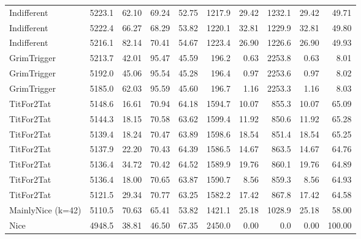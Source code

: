 \documentclass[journal,a4paper,10pt,twoside]{IEEEtran} %
\begin{document}
\begin{table}[ht]
\begin{tabular}{l|rrrr|rrrrr}
		Indifferent       & 5223.1 & 62.10 &     69.24 &    52.75 & 1217.9 &                  29.42 & 1232.1 &                   29.42 &  49.71 \\
		Indifferent       & 5222.4 & 66.27 &     68.29 &    53.82 & 1220.1 &                  32.81 & 1229.9 &                   32.81 &  49.80 \\
		Indifferent       & 5216.1 & 82.14 &     70.41 &    54.67 & 1223.4 &                  26.90 & 1226.6 &                   26.90 &  49.93 \\
		GrimTrigger       & 5213.7 & 42.01 &     95.47 &    45.59 &  196.2 &                   0.63 & 2253.8 &                    0.63 &   8.01 \\
		GrimTrigger       & 5192.0 & 45.06 &     95.54 &    45.28 &  196.4 &                   0.97 & 2253.6 &                    0.97 &   8.02 \\
		GrimTrigger       & 5185.0 & 62.03 &     95.59 &    45.60 &  196.7 &                   1.16 & 2253.3 &                    1.16 &   8.03 \\
		TitFor2Tat        & 5148.6 & 16.61 &     70.94 &    64.18 & 1594.7 &                  10.07 &  855.3 &                   10.07 &  65.09 \\
		TitFor2Tat        & 5144.3 & 18.15 &     70.58 &    63.62 & 1599.4 &                  11.92 &  850.6 &                   11.92 &  65.28 \\
		TitFor2Tat        & 5139.4 & 18.24 &     70.47 &    63.89 & 1598.6 &                  18.54 &  851.4 &                   18.54 &  65.25 \\
		TitFor2Tat        & 5137.9 & 22.20 &     70.43 &    64.39 & 1586.5 &                  14.67 &  863.5 &                   14.67 &  64.76 \\
		TitFor2Tat        & 5136.4 & 34.72 &     70.42 &    64.52 & 1589.9 &                  19.76 &  860.1 &                   19.76 &  64.89 \\
		TitFor2Tat        & 5136.4 & 18.00 &     70.65 &    63.87 & 1590.7 &                   8.56 &  859.3 &                    8.56 &  64.93 \\
		TitFor2Tat        & 5121.5 & 29.34 &     70.77 &    63.25 & 1582.2 &                  17.42 &  867.8 &                   17.42 &  64.58 \\
		MainlyNice (k=42) & 5110.5 & 70.63 &     65.41 &    53.82 & 1421.1 &                  25.18 & 1028.9 &                   25.18 &  58.00 \\
		Nice              & 4948.5 & 38.81 &     46.50 &    67.35 & 2450.0 &                   0.00 &    0.0 &                    0.00 & 100.00 \\

\end{tabular}
\end{table}
\end{document}
